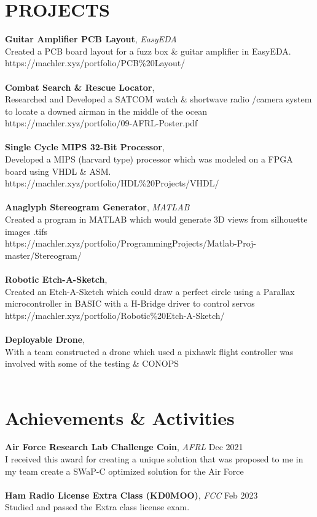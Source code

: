 \documentclass[line,margin]{res}
\begin{document}
\begin{resume}
	\section{PROJECTS}
	\textbf{Guitar Amplifier PCB Layout}, {\sl EasyEDA}\\ Created a PCB board layout for a fuzz box \& guitar amplifier in EasyEDA.\\ https://machler.xyz/portfolio/PCB\%20Layout/\\\\
	\textbf{Combat Search \& Rescue Locator}, {\sl }\\ Researched and Developed a SATCOM watch \& shortwave radio /camera system to locate a downed airman in the middle of the ocean\\ https://machler.xyz/portfolio/09-AFRL-Poster.pdf\\\\
	\textbf{Single Cycle MIPS 32-Bit Processor}, {\sl }\\ Developed a MIPS (harvard type) processor which was modeled on a FPGA board using VHDL \& ASM.\\ https://machler.xyz/portfolio/HDL\%20Projects/VHDL/\\\\
	\textbf{Anaglyph Stereogram Generator}, {\sl MATLAB}\\ Created a program in MATLAB which would generate 3D views from silhouette images .tifs\\ https://machler.xyz/portfolio/ProgrammingProjects/Matlab-Proj-master/Stereogram/\\\\
	\textbf{Robotic Etch-A-Sketch}, {\sl }\\ Created an Etch-A-Sketch which could draw a perfect circle using a Parallax microcontroller in BASIC with a H-Bridge driver to control servos\\ https://machler.xyz/portfolio/Robotic\%20Etch-A-Sketch/\\\\
	\textbf{Deployable Drone}, {\sl }\\ With a team constructed a drone which used a pixhawk flight controller was involved with some of the testing \& CONOPS\\\\
	\section{Achievements \& Activities}
	\textbf{Air Force Research Lab Challenge Coin}, {\sl AFRL} \hfill Dec 2021 \\
	I received this award for creating a unique solution that was proposed to me in my team create a SWaP-C optimized solution for the Air Force \\\\
	\textbf{Ham Radio License Extra Class (KD0MOO)}, {\sl FCC} \hfill Feb 2023 \\
	Studied and passed the Extra class license exam. \\\\
	\ 
\end{resume}
\end{document}
